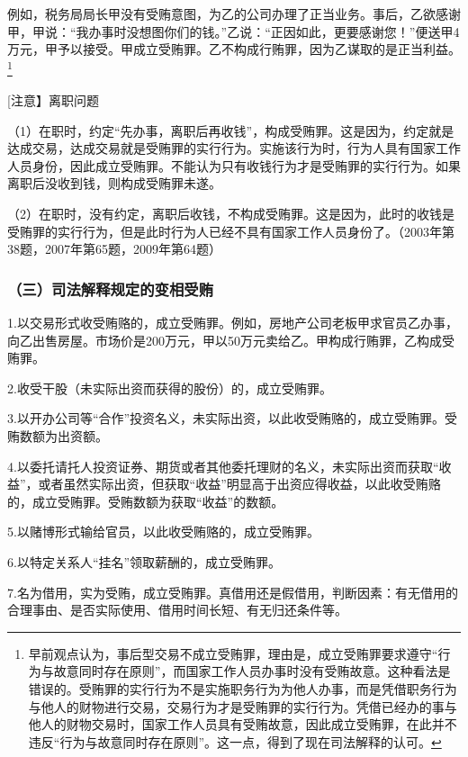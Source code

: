 例如，税务局局长甲没有受贿意图，为乙的公司办理了正当业务。事后，乙欲感谢甲，甲说：“我办事时没想图你们的钱。”乙说：“正因如此，更要感谢您！”便送甲4万元，甲予以接受。甲成立受贿罪。乙不构成行贿罪，因为乙谋取的是正当利益。\footnote{早前观点认为，事后型交易不成立受贿罪，理由是，成立受贿罪要求遵守“行为与故意同时存在原则”，而国家工作人员办事时没有受贿故意。这种看法是错误的。受贿罪的实行行为不是实施职务行为为他人办事，而是凭借职务行为与他人的财物进行交易，交易行为才是受贿罪的实行行为。凭借已经办的事与他人的财物交易时，国家工作人员具有受贿故意，因此成立受贿罪，在此并不违反“行为与故意同时存在原则”。这一点，得到了现在司法解释的认可。}

[注意】离职问题

（1）在职时，约定“先办事，离职后再收钱”，构成受贿罪。这是因为，约定就是达成交易，达成交易就是受贿罪的实行行为。实施该行为时，行为人具有国家工作人员身份，因此成立受贿罪。不能认为只有收钱行为才是受贿罪的实行行为。如果离职后没收到钱，则构成受贿罪未遂。

（2）在职时，没有约定，离职后收钱，不构成受贿罪。这是因为，此时的收钱是受贿罪的实行行为，但是此时行为人已经不具有国家工作人员身份了。（2003年第38题，2007年第65题，2009年第64题）

\subsubsection*{（三）司法解释规定的变相受贿\protect\footnotemark}

1.以交易形式收受贿赂的，成立受贿罪。例如，房地产公司老板甲求官员乙办事，向乙出售房屋。市场价是200万元，甲以50万元卖给乙。甲构成行贿罪，乙构成受贿罪。

2.收受干股（未实际出资而获得的股份）的，成立受贿罪。

3.以开办公司等“合作”投资名义，未实际出资，以此收受贿赂的，成立受贿罪。受贿数额为出资额。

4.以委托请托人投资证券、期货或者其他委托理财的名义，未实际出资而获取“收益”，或者虽然实际出资，但获取“收益”明显高于出资应得收益，以此收受贿赂的，成立受贿罪。受贿数额为获取“收益”的数额。

5.以赌博形式输给官员，以此收受贿赂的，成立受贿罪。

6.以特定关系人“挂名”领取薪酬的，成立受贿罪。

7.名为借用，实为受贿，成立受贿罪。真借用还是假借用，判断因素：有无借用的合理事由、是否实际使用、借用时间长短、有无归还条件等。

